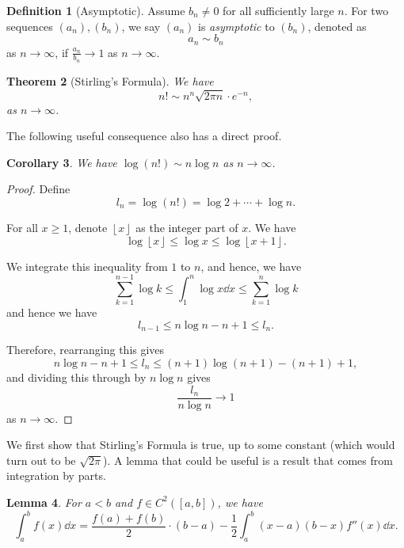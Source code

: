 \documentclass[11pt]{article}
\numberwithin{equation}{section}
\newtheorem{theorem}{Theorem}[section]
\newtheorem{lemma}[theorem]{Lemma}
\newtheorem{corollary}[theorem]{Corollary}
\theoremstyle{definition}
\newtheorem{definition}[theorem]{Definition}
\theoremstyle{remark}
\newcommand{\pqty}[1]{\left(#1\right)}
\newcommand{\floor}[1]{\left\lfloor#1\right\rfloor}
\begin{document}
\begin{definition}[Asymptotic]\label{probability-definition-007}
    \label{probability-def:asymptotic}
Assume \(b_n\ne0\) for all sufficiently large \(n\).
%
    For two sequences \(\pqty{a_n}, \pqty{b_n}\), we say \(\pqty{a_n}\) is \emph{asymptotic} to \(\pqty{b_n}\), denoted as
    \[
        a_n \sim b_n
    \]
    as \(n \to \infty\), if \(\frac{a_n}{b_n} \to 1\) as \(n \to \infty\).
\end{definition}

\begin{theorem}[Stirling's Formula]\label{probability-theorem-001}
    \label{probability-thm:stirling-formula}%
    We have
    \[
        n! \sim n^n \sqrt{2 \pi n} \cdot e^{-n},
    \]
    as \(n \to \infty\).
\end{theorem}

The following useful consequence also has a direct proof.

\begin{corollary}\label{probability-corollary-001}
    \label{probability-cor:weaker-statement-of-stirling}%
    We have \(\log \pqty{n!} \sim n \log n\) as \(n \to \infty\).
\end{corollary}

\begin{proof}\label{probability-proof-001}
    Define
    \[
        l_n = \log\pqty{n!} = \log 2 + \cdots + \log n.
    \]

    For all \(x \geq 1\), denote \(\floor{x}\) as the integer part of \(x\). We have
    \[
        \log \floor{x} \leq \log x \leq \log \floor{x + 1}.
    \]

    We integrate this inequality from \(1\) to \(n\), and hence, we have
    \[
        \sum_{k = 1}^{n - 1} \log k \leq \int_{1}^{n} \log x \dd{x} \leq \sum_{k = 1}^{n} \log k
    \]
    and hence we have
    \[
        l_{n - 1} \leq n \log n - n + 1 \leq l_n.
    \]

    Therefore, rearranging this gives
    \[
        n \log n - n + 1 \leq l_n \leq \pqty{n + 1} \log \pqty{n + 1} - \pqty{n + 1} + 1,
    \]
    and dividing this through by \(n \log n\) gives
    \[
        \frac{l_n}{n \log n} \to 1
    \]
    as \(n \to \infty\).
\end{proof}

We first show that Stirling's Formula is true, up to some constant (which would turn out to be \(\sqrt{2\pi}\)). A lemma that could be useful is a result that comes from integration by parts.

\begin{lemma}\label{probability-lemma-001}
    \label{probability-lem:some-integration-formula}%
    For \(a<b\) and \(f\in C^2([a,b])\), we have
    \[
        \int_a^b f\pqty{x} \dd{x} = \frac{f\pqty{a} + f\pqty{b}}{2} \cdot \pqty{b - a} - \frac{1}{2} \int_a^b \pqty{x - a} \pqty{b - x} f''\pqty{x} \dd{x}.
    \]
\end{lemma}
\end{document}
